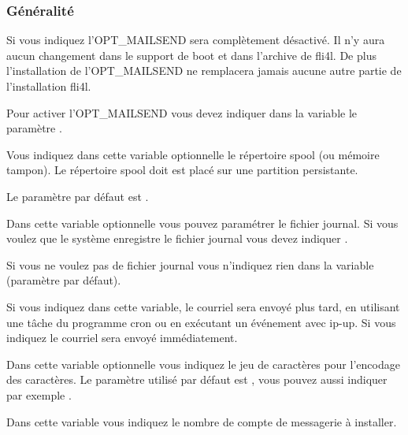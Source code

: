 \subsubsection {Généralité}
\begin{description}


    Si vous indiquez  l'OPT\_MAILSEND sera complètement désactivé.
	Il n'y aura aucun changement dans le support de boot  et dans
	l'archive  de fli4l.
	De plus l'installation de l'OPT\_MAILSEND ne remplacera jamais aucune autre partie
	de l'installation fli4l.

    Pour activer l'OPT\_MAILSEND vous devez indiquer dans la variable 
	le paramètre .


    Vous indiquez dans cette variable optionnelle le répertoire spool (ou mémoire
	tampon). Le répertoire spool doit est placé sur une partition persistante.

    Le paramètre par défaut est .


    Dans cette variable optionnelle vous pouvez paramétrer le fichier journal.
	Si vous voulez que le système enregistre le fichier journal vous devez indiquer
	.

    Si vous ne voulez pas de fichier journal vous n'indiquez rien 
	dans la variable (paramètre par défaut).


    Si vous indiquez  dans cette variable, le courriel sera envoyé plus tard,
	en utilisant une tâche du programme cron ou en exécutant un événement avec ip-up.
	Si vous indiquez  le courriel sera envoyé immédiatement.


    Dans cette variable optionnelle vous indiquez le jeu de caractères pour l'encodage
	des caractères. Le paramètre utilisé par défaut est , vous pouvez
	aussi indiquer par exemple .


    Dans cette variable vous indiquez le nombre de compte de messagerie à installer.

\end{description}

